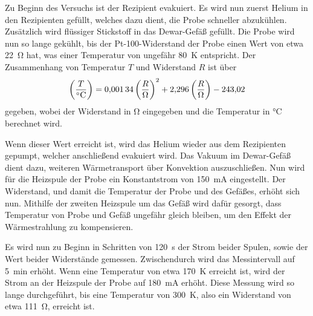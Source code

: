     Zu Beginn des Versuchs ist der Rezipient evakuiert.
    Es wird nun zuerst Helium in den Rezipienten gefüllt,
    welches dazu dient,
    die Probe schneller abzukühlen.
    Zusätzlich wird flüssiger Stickstoff in das Dewar-Gefäß gefüllt.
    Die Probe wird nun so lange gekühlt,
    bis der Pt-100-Widerstand der Probe einen Wert von etwa \SI{22}{\ohm} hat,
    was einer Temperatur von ungefähr \SI{80}{\kelvin} entspricht.
    Der Zusammenhang von Temperatur $T$ und Widerstand $R$ ist über
    \begin{equation}
        \def\T{\left(\frac{T}{\si{\celsius}}\right)}
        \def\R{\left(\frac{R}{\si{\ohm}}\right)}
        \T = \num{0.00134} \R^2 + \num{2.296} \R - \num{243.02}
        \label{eqn:durchfuehrung:pt100}
    \end{equation}
    gegeben,
    wobei der Widerstand in \si{\ohm} eingegeben und die Temperatur in \si{\celsius} berechnet wird.

    Wenn dieser Wert erreicht ist,
    wird das Helium wieder aus dem Rezipienten gepumpt,
    welcher anschließend evakuiert wird.
    Das Vakuum im Dewar-Gefäß dient dazu,
    weiteren Wärmetransport über Konvektion auszuschließen.
    Nun wird für die Heizspule der Probe ein Konstantstrom von \SI{150}{\milli\ampere} eingestellt.
    Der Widerstand,
    und damit die Temperatur der Probe und des Gefäßes,
    erhöht sich nun.
    Mithilfe der zweiten Heizspule um das Gefäß wird dafür gesorgt,
    dass Temperatur von Probe und Gefäß ungefähr gleich bleiben,
    um den Effekt der Wärmestrahlung zu kompensieren.

    Es wird nun zu Beginn in Schritten von \SI{120}{\second} der Strom beider Spulen,
    sowie der Wert beider Widerstände gemessen.
    Zwischendurch wird das Messintervall auf \SI{5}{\minute} erhöht.
    Wenn eine Temperatur von etwa \SI{170}{\kelvin} erreicht ist,
    wird der Strom an der Heizspule der Probe auf \SI{180}{\milli\ampere} erhöht.
    Diese Messung wird so lange durchgeführt,
    bis eine Temperatur von \SI{300}{\kelvin},
    also ein Widerstand von etwa \SI{111}{\ohm},
    erreicht ist.

